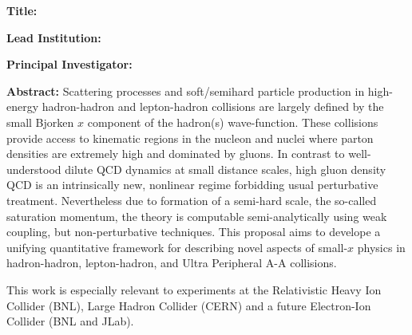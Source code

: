 %
\vspace{0.5em}
\noindent
{\bf Title:} \Title

\vspace{0.5em}
\noindent
{\bf Lead Institution:} \Institute

\vspace{0.5em}
\noindent
{\bf Principal Investigator:} \Investigator


\vspace{0.5em}
\noindent


\vspace{0.5em}
\noindent
{\bf Abstract:} 
Scattering processes and soft/semihard particle production in high-energy
hadron-hadron and lepton-hadron collisions are largely defined  by the 
small Bjorken $x$ component of the hadron(s) wave-function. 
These  collisions provide access to kinematic regions 
in the nucleon and nuclei where parton densities are extremely high 
and dominated by gluons. In contrast to 
well-understood dilute QCD dynamics at small distance scales, 
high gluon density QCD is an intrinsically new, nonlinear regime
forbidding usual perturbative treatment. Nevertheless due to formation of a semi-hard scale, 
the so-called saturation momentum, the theory is computable semi-analytically using 
weak coupling, but non-perturbative techniques.
This proposal aims to develope  a unifying quantitative framework for 
describing  novel aspects of small-$x$ physics in hadron-hadron,
lepton-hadron, and Ultra Peripheral A-A collisions.

This work is especially relevant to experiments at the Relativistic Heavy Ion Collider (BNL),
Large Hadron Collider (CERN) and a future Electron-Ion Collider (BNL and JLab).  





